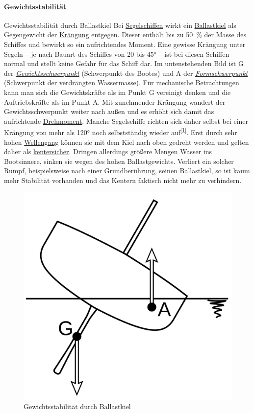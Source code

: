 \paragraph{Gewichtsstabilität}
Gewichtsstabilität durch Ballastkiel
Bei \href{https://de.wikipedia.org/wiki/Segelschiff}{Segelschiffen} wirkt ein \href{https://de.wikipedia.org/wiki/Kiel_(Schiffbau)}{Ballastkiel} als Gegengewicht der \href{https://de.wikipedia.org/wiki/Kr\%C3\%A4ngung}{Krängung} entgegen. Dieser enthält bis zu 50 \% der Masse des Schiffes und bewirkt so ein aufrichtendes Moment. Eine gewisse Krängung unter Segeln – je nach Bauart des Schiffes von 20 bis 45° – ist bei diesen Schiffen normal und stellt keine Gefahr für das Schiff dar. Im untenstehenden Bild ist G der \textit{\href{https://de.wikipedia.org/wiki/Gewichtsschwerpunkt}{Gewichtsschwerpunkt}} (Schwerpunkt des Bootes) und A der \textit{\href{https://de.wikipedia.org/wiki/Formschwerpunkt}{Formschwerpunkt}} (Schwerpunkt der verdrängten Wassermasse). Für mechanische Betrachtungen kann man sich die Gewichtskräfte als im Punkt G vereinigt denken und die Auftriebskräfte als im Punkt A. Mit zunehmender Krängung wandert der Gewichtsschwerpunkt weiter nach außen und es erhöht sich damit das aufrichtende \href{https://de.wikipedia.org/wiki/Drehmoment}{Drehmoment}. Manche Segelschiffe richten sich daher selbst bei einer Krängung von mehr als 120° noch selbstständig wieder auf\textsuperscript{\href{https://de.wikipedia.org/wiki/Stabilit\%C3\%A4t_(Schiffsk\%C3\%B6rper)\#cite_note-Seemannschaft,_Seite_163-1}{[1]}}. Erst durch sehr hohen \href{https://de.wikipedia.org/wiki/Seegang}{Wellengang} können sie mit dem Kiel nach oben gedreht werden und gelten daher als \href{https://de.wikipedia.org/wiki/Kentern}{kentersicher}. Dringen allerdings größere Mengen Wasser ins Bootsinnere, sinken sie wegen des hohen Ballastgewichts. Verliert ein solcher Rumpf, beispielsweise nach einer Grundberührung, seinen Ballastkiel, so ist kaum mehr Stabilität vorhanden und das Kentern faktisch nicht mehr zu verhindern. 
\begin{figure}
    \centering
    \includegraphics[width=0.5\linewidth]{Segeln_Gewichtsstabilitaet.svg.png}
    \caption{Gewichtsstabilität durch Ballastkiel }
    \label{fig:enter-label}
\end{figure}

